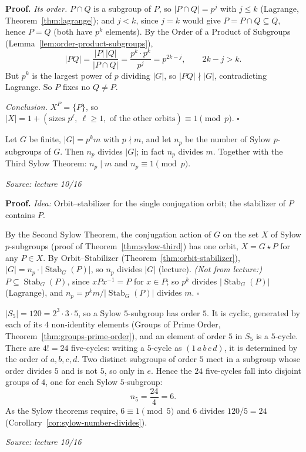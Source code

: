 \documentclass[11pt]{report}
\renewenvironment{proof}[1][Proof]{\noindent\textbf{#1.} }{\hfill$\square$\par\vspace{5pt}}
\newcommand{\srcline}[1]{\par\hfill{\footnotesize\textit{Source: #1}}}
\begin{document}
\begin{proof}
\emph{Its order.} $P \cap Q$ is a subgroup of $P$, so $|P \cap Q| = p^j$ with $j \leq k$ (Lagrange, Theorem~\ref{thm:lagrange}); and $j < k$, since $j = k$ would give $P = P \cap Q \subseteq Q$, hence $P = Q$ (both have $p^k$ elements). By the Order of a Product of Subgroups (Lemma~\ref{lem:order-product-subgroups}),
\[ |PQ| = \frac{|P|\,|Q|}{|P \cap Q|} = \frac{p^k \cdot p^k}{p^j} = p^{2k - j}, \qquad 2k - j > k. \]
But $p^k$ is the largest power of $p$ dividing $|G|$, so $|PQ| \nmid |G|$, contradicting Lagrange. So $P$ fixes no $Q \neq P$.

\emph{Conclusion.} $X^P = \{P\}$, so $|X| = 1 + (\text{sizes } p^\ell,\ \ell \geq 1, \text{ of the other orbits}) \equiv 1 \pmod p$.
\end{proof}

\begin{corbox}\label{cor:sylow-number-divides}
Let $G$ be finite, $|G| = p^k m$ with $p \nmid m$, and let $n_p$ be the number of Sylow $p$-subgroups of $G$. Then $n_p$ divides $|G|$; in fact $n_p$ divides $m$. Together with the Third Sylow Theorem: $n_p \mid m$ and $n_p \equiv 1 \pmod p$.
\srcline{lecture 10/16}
\end{corbox}

\begin{proof}
\textit{Idea:} Orbit--stabilizer for the single conjugation orbit; the stabilizer of $P$ contains $P$.\par
By the Second Sylow Theorem, the conjugation action of $G$ on the set $X$ of Sylow $p$-subgroups (proof of Theorem~\ref{thm:sylow-third}) has one orbit, $X = G \star P$ for any $P \in X$. By Orbit--Stabilizer (Theorem~\ref{thm:orbit-stabilizer}), $|G| = n_p \cdot |\operatorname{Stab}_G(P)|$, so $n_p$ divides $|G|$ (lecture). \textit{(Not from lecture:)} $P \subseteq \operatorname{Stab}_G(P)$, since $xPx^{-1} = P$ for $x \in P$; so $p^k$ divides $|\operatorname{Stab}_G(P)|$ (Lagrange), and $n_p = p^k m / |\operatorname{Stab}_G(P)|$ divides $m$.
\end{proof}

\begin{exbox}\label{ex:sylow-5-s5}
$|S_5| = 120 = 2^3 \cdot 3 \cdot 5$, so a Sylow $5$-subgroup has order $5$. It is cyclic, generated by each of its $4$ non-identity elements (Groups of Prime Order, Theorem~\ref{thm:groups-prime-order}), and an element of order $5$ in $S_5$ is a $5$-cycle. There are $4! = 24$ five-cycles: writing a $5$-cycle as $(1\,a\,b\,c\,d)$, it is determined by the order of $a, b, c, d$. Two distinct subgroups of order $5$ meet in a subgroup whose order divides $5$ and is not $5$, so only in $e$. Hence the $24$ five-cycles fall into disjoint groups of $4$, one for each Sylow $5$-subgroup:
\[ n_5 = \frac{24}{4} = 6 . \]
As the Sylow theorems require, $6 \equiv 1 \pmod 5$ and $6$ divides $120 / 5 = 24$ (Corollary~\ref{cor:sylow-number-divides}).
\srcline{lecture 10/16}
\end{exbox}
\end{document}
